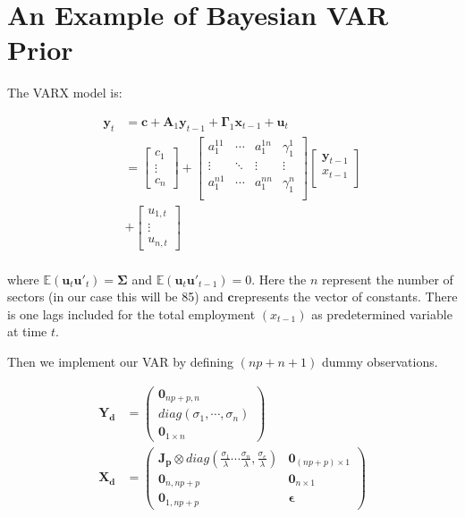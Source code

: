 \documentclass{monashthesis}
\begin{document}
\appendix

\hypertarget{an-example-of-bayesian-var-prior}{%
\chapter{An Example of Bayesian VAR Prior}\label{an-example-of-bayesian-var-prior}}

The VARX model is:

\[
\begin{aligned}
\boldsymbol{y}_t&=\boldsymbol{c}+\boldsymbol{A}_1 \boldsymbol{y}_{t-1}+\boldsymbol{\Gamma}_1\boldsymbol{x}_{t-1}+\boldsymbol{u}_t\\
&=
\begin{bmatrix}
c_1\\
\vdots\\
c_n
\end{bmatrix}
+
\begin{bmatrix}
a_1^{11}&\cdots&a_1^{1n}&\gamma_1^{1}\\
\vdots&\ddots&\vdots&\vdots\\
a_1^{n1}&\cdots&a_1^{nn}&\gamma_1^n\\
\end{bmatrix}
\begin{bmatrix}
\boldsymbol{y}_{t-1}\\
x_{t-1}\\
\end{bmatrix}\\
&+
\begin{bmatrix}
u_{1,t}\\
\vdots\\
u_{n,t}
\end{bmatrix}\\
\end{aligned}
\]

where \(\mathbb{E}(\boldsymbol{u}_t\boldsymbol{u}'_t)=\boldsymbol{\Sigma}\) and \(\mathbb{E}(\boldsymbol{u}_t\boldsymbol{u'}_{t-1})=0\). Here the \(n\) represent the number of sectors (in our case this will be 85) and \(\boldsymbol{c}\)represents the vector of constants. There is one lags included for the total employment \((x_{t-1})\) as predetermined variable at time \(t\).

Then we implement our VAR by defining \((np+n+1)\) dummy observations.

\[
\begin{aligned}
\boldsymbol{Y_d}&=
\begin{pmatrix}
\boldsymbol0_{np+p,n}\\
diag({\sigma_1,\cdots,\sigma_n})\\
\boldsymbol0_{1\times n}
\end{pmatrix}\\
\boldsymbol{X_d}&=
\begin{pmatrix}
\boldsymbol{J_p}\otimes diag(\frac{\sigma_1}{\lambda}\cdots\frac{\sigma_n}{\lambda},\frac{\sigma_e}{\lambda})&\boldsymbol0_{(np+p)\times1}\\
\boldsymbol 0_{n,np+p}&\boldsymbol 0_{n\times1}
\\
\boldsymbol 0_{1,np+p}&\boldsymbol{\epsilon}
\end{pmatrix}
\end{aligned}
\]
\end{document}
